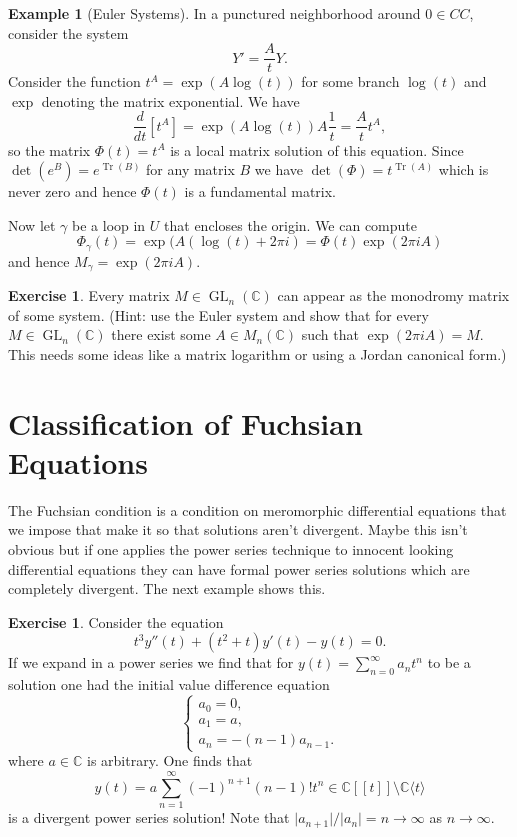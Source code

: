 \documentclass[]{book}
\numberwithin{equation}{section}
\theoremstyle{definition}
\newtheorem{example}[theorem]{Example}
\newtheorem{exercise}[theorem]{Exercise}
\theoremstyle{remark}
\newcommand{\CC}{\mathbb{C}}
\newcommand{\GL}{\operatorname{GL}}
\newcommand{\Tr}{\operatorname{Tr}}
\begin{document}
	\begin{example}[Euler Systems]
	In a punctured neighborhood around $0 \in CC$, consider the system 
	$$ Y' = \frac{A}{t} Y. $$
	Consider the function $t^A = \exp(A \log(t))$ for some branch $\log(t)$ and $\exp$ denoting the matrix exponential. We have 
	$$\dfrac{d}{dt}\left[ t^A\right] = \exp(A \log(t) ) A \frac{1}{t} = \frac{A}{t} t^A,$$
	so the matrix $\Phi(t) = t^A$ is a local matrix solution of this equation. 
	Since $\det(e^B) = e^{\Tr(B)}$ for any matrix $B$ we have $\det(\Phi) = t^{\Tr(A)}$ which is never zero and hence $\Phi(t)$ is a fundamental matrix. 
	
	Now let $\gamma$ be a loop in $U$ that encloses the origin.  
	We can compute 
	 $$\Phi_{\gamma}(t) = \exp( A( \log(t) + 2\pi i) = \Phi(t) \exp(2\pi i A) $$
	and hence $M_{\gamma} = \exp(2\pi i A).$
\end{example}

\begin{exercise}
	Every matrix $M \in \GL_n(\CC)$ can appear as the monodromy matrix of some system. (Hint: use the Euler system and show that for every $M \in \GL_n(\CC)$ there exist some $A \in M_n(\CC)$ such that $\exp(2\pi i A) = M$. This needs some ideas like a matrix logarithm or using a Jordan canonical form.)
\end{exercise}

\section[Fuchsian Condition]{Classification of Fuchsian Equations}
The Fuchsian condition is a condition on meromorphic differential equations that we impose that make it so that solutions aren't divergent. 
Maybe this isn't obvious but if one applies the power series technique to innocent looking differential equations they can have formal power series solutions which are completely divergent. 
The next example shows this.
\begin{exercise}
	Consider the equation 
	 $$ t^3 y''(t) + (t^2+t) y'(t) - y(t) =0.$$
	If we expand in a power series we find that for $ y(t) = \sum_{n=0}^{\infty} a_n t^n $
	to be a solution one had the initial value difference equation
	$$\begin{cases}
	a_0 =0, \\
	a_1 = a, \\
	a_n = -(n-1)a_{n-1}.
	\end{cases}$$
	where $a \in \CC$ is arbitrary. 
	One finds that 
	$$ y(t) = a \sum_{n=1}^{\infty} (-1)^{n+1} (n-1)! t^n \in \CC[[t]]\setminus \CC\langle t \rangle$$
	is a divergent power series solution! Note that $\vert a_{n+1} \vert/\vert a_n \vert = n \to \infty$ as $n\to \infty$.
\end{exercise}	
\end{document}
